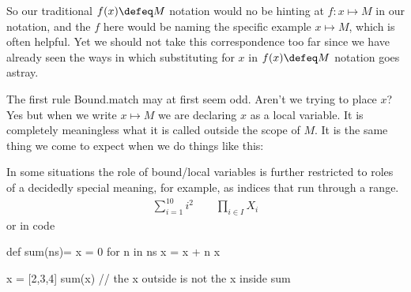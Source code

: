 So our traditional $f(x)\defeq M$ notation would no be hinting at 
$f:x\mapsto M$ in our notation, and the $f$ here would be naming 
the specific example $x\mapsto M$, which is often helpful.  Yet 
we should not take this correspondence too far since we have already 
seen the ways in which substituting for $x$ in $f(x)\defeq M$ notation 
goes astray.

The first rule Bound.match may at first seem odd.  Aren't we trying to place $x$?
Yes but when we write $x\mapsto M$ we are declaring $x$ as a local variable.  
It is completely meaningless what it is called outside the scope of $M$.
It is the same thing we come to expect when we do things like this:


In some situations the role of bound/local variables is further 
restricted to roles of a decidedly special meaning, for example, as indices that 
run through a range.
\begin{align*}
    \sum_{i=1}^{10} i^2 \qquad \prod_{i\in I}X_i 
\end{align*}
or in code 
\begin{center}
\begin{Pcode}[]
def sum(ns)= {
  x = 0
  for n in ns 
    x = x + n
  x  
}

x = [2,3,4]
sum(x)  // the x outside is not the x inside sum
\end{Pcode}
\end{center}


